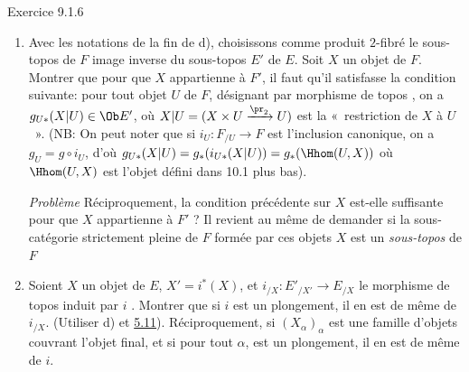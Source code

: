 \documentclass[10pt]{../fichiers-configuration-latex/smfart}
\begin{document}
\begin{enonce*}[remark]{Exercice 9.1.6}
\begin{enumerate}
\item Avec les notations de la fin de d), choisissons comme produit
$2$-fibré le sous-topos de $F$ image inverse du sous-topos $E'$ de
$E$. Soit $X$ un objet de $F$. Montrer que pour que $X$ appartienne
à $F'$, il faut qu'il satisfasse la condition suivante: pour tout
objet $U$ de $F$, désignant par 
morphisme de topos , on a $g_{U\ast}(X| U)\in \Ob E'$,
où $X| U=(X\times U\xrightarrow{\pr_2}U)$ est la « restriction de
$X$ à $U$ ». (NB: On peut noter que si $i_U:F_{/U}\rightarrow F$
est l'inclusion canonique, on a $g_U=g\circ i_U$, d'où $g_{U\ast}(X|
U)=g_{\ast}(i_{U\ast}(X| U))=g_{\ast}(\Hhom(U,X))$ où $\Hhom(U,X)$
est l'objet défini dans 10.1 plus bas).

\noindent \emph{Problème} Réciproquement, la condition précédente
sur $X$ est-elle suffisante pour que $X$ appartienne à $F'$ ? Il
revient au même de demander si la sous-catégorie strictement pleine
de $F$ formée par ces objets $X$ est un \emph{sous-topos} de $F$

\item Soient $X$ un objet de $E$, $X'=i^{\ast}(X)$, et
$i_{/X}:E'_{/X'}\rightarrow E_{/X}$ le morphisme de topos induit par
$i$ . Montrer que si $i$ est un plongement, il en est
de même de $i_{/X}$. (Utiliser d) et \hyperref[IV.prop5.11]{5.11}).
Réciproquement, si $(X_{\alpha})_{\alpha}$ est une famille d'objets
couvrant l'objet final, et si pour tout $\alpha$,  est
un plongement, il en est de même de $i$.
\end{enumerate}
\end{enonce*}
\end{document}
